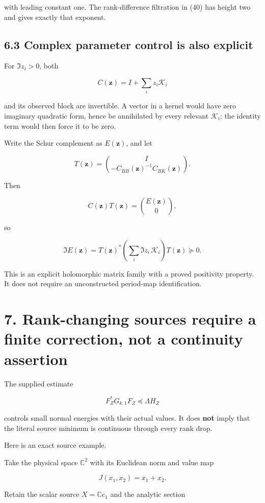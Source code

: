 with leading constant one. The rank-difference filtration in (40) has height two and gives exactly that exponent.

\subsection{6.3 Complex parameter control is also explicit}\label{complex-parameter-control-is-also-explicit}

For \(\Im z_i>0\), both

\[
C(\mathbf z)=I+\sum_i z_i\mathcal K_i
\]

and its observed block are invertible. A vector in a kernel would have zero imaginary quadratic form, hence be annihilated by every relevant \(\mathcal K_i\); the identity term would then force it to be zero.

Write the Schur complement as \(E(\mathbf z)\), and let

\[
T(\mathbf z)=
\binom{I}{-C_{BB}(\mathbf z)^{-1}C_{BK}(\mathbf z)}.
\]

Then

\[
C(\mathbf z)T(\mathbf z)=\binom{E(\mathbf z)}0,
\]

so

\[
\boxed{
\Im E(\mathbf z)
=
T(\mathbf z)^*
\left(\sum_i\Im z_i\,\mathcal K_i\right)
T(\mathbf z)\succeq0.
}
\tag{42}
\]

This is an explicit holomorphic matrix family with a proved positivity property. It does not require an unconstructed period-map identification.

\section{7. Rank-changing sources require a finite correction, not a continuity assertion}\label{rank-changing-sources-require-a-finite-correction-not-a-continuity-assertion}

The supplied estimate

\[
F_Z^*G_{k,1}F_Z\preceq\Lambda H_Z
\]

controls small normal energies with their actual values. It does \textbf{not} imply that the literal source minimum is continuous through every rank drop.

Here is an exact source example.

Take the physical space \(\mathbb C^2\) with its Euclidean norm and value map

\[
J(x_1,x_2)=x_1+x_2.
\]

Retain the scalar source \(X=\mathbb Ce_1\) and the analytic section

